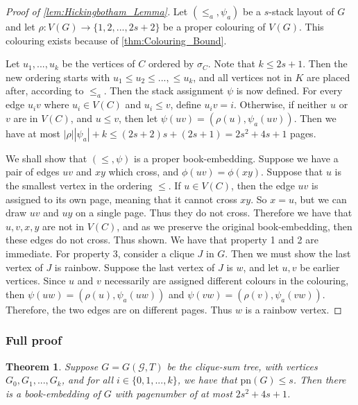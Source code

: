 \documentclass[]{report}
\newcommand{\pn}{\text{pn}}
\newtheorem{theorem}{Theorem}
\theoremstyle{definition}
\numberwithin{theorem}{section}
\numberwithin{equation}{section}
\begin{document}
\begin{proof}[Proof of \cref{lem:Hickingbotham_Lemma}]
	Let $(\leq_a, \psi_a)$ be a $s$-stack layout of $G$ and let $\rho: V(G) \rightarrow \lbrace 1, 2, ..., 2s + 2 \rbrace$ be a proper colouring of $V(G)$. This colouring exists because of \cref{thm:Colouring_Bound}.

Let $u_1, ..., u_k$ be the vertices of $C$ ordered by $\sigma_C$. Note that $k \leq 2s + 1$. Then the new ordering starts with $u_1 \leq u_2 \leq ..., \leq u_k$, and all vertices not in $K$ are placed after, according to $\leq_a$.
Then the stack assignment $\psi$ is now defined. For every edge $u_i v$ where $u_i \in V(C)$ and $u_i \leq v$, define $u_i v = i$. Otherwise, if neither $u$ or $v$ are in $V(C)$, and $u \leq v$, then let $\psi(uv) = (\rho(u), \psi_a(uv))$. Then we have at most $|\rho| |\psi_a| + k \leq (2s + 2) s + (2s + 1) = 2s^2 + 4s + 1$ pages.

We shall show that $(\leq, \psi)$ is a proper book-embedding. Suppose we have a pair of edges $uv$ and $xy$ which cross, and $\phi(uv) = \phi(xy)$. Suppose that $u$ is the smallest vertex in the ordering $\leq$. If $u \in V(C)$, then the edge $uv$ is assigned to its own page, meaning that it cannot cross $xy$. So $x = u$, but we can draw $uv$ and $uy$ on a single page. Thus they do not cross. Therefore we have that $u, v, x, y$ are not in $V(C)$, and as we preserve the original book-embedding, then these edges do not cross. Thus shown.
We have that property 1 and 2 are immediate. For property 3, consider a clique $J$ in $G$. Then we must show the last vertex of $J$ is rainbow. Suppose the last vertex of $J$ is $w$, and let $u, v$ be earlier vertices. Since $u$ and $v$ necessarily are assigned different colours in the colouring, then $\psi(uw) = (\rho(u), \psi_a(uw))$ and $\psi(vw) = (\rho(v), \psi_a(vw))$. Therefore, the two edges are on different pages. Thus $w$ is a rainbow vertex. 
\end{proof}

\subsubsection{Full proof}
\begin{theorem}
	Suppose $G = G(\mathcal{G}, T)$ be the clique-sum tree, with vertices $G_0, G_1, ..., G_k$, and for all $i \in \lbrace 0, 1, ..., k \rbrace$, we have that $\pn(G) \leq s$. Then there is a book-embedding of $G$ with pagenumber of at most $2s^2 + 4s + 1$. 
\end{theorem}
\end{document}
